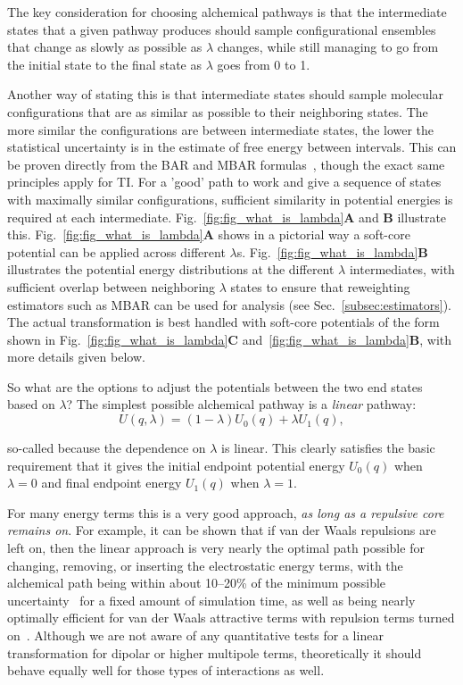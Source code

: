 \documentclass[9pt,bestpractices]{livecoms}
\begin{document}
The key consideration for choosing alchemical pathways is that the intermediate states that a given pathway produces should sample configurational ensembles that change as slowly as possible as $\lambda$ changes, while still managing to go from the initial state to the final state as $\lambda$ goes from 0 to 1.

Another way of stating this is that intermediate states should sample molecular configurations that are as similar as possible to their neighboring states. The more similar the configurations are between intermediate states, the lower the statistical uncertainty is in the estimate of free energy between intervals. This can be proven directly from the BAR and MBAR formulas~\cite{bennett1976efficient,klimovich2015guidelines}, though the exact same principles apply for TI. For a 'good' path to work and give a sequence of states with maximally similar configurations, sufficient similarity in potential energies is required at each intermediate. Fig.~\ref{fig:fig_what_is_lambda}\textbf{A} and \textbf{B} illustrate this. Fig.~\ref{fig:fig_what_is_lambda}\textbf{A} shows in a pictorial way a soft-core potential can be applied across different $\lambda$s. Fig.~\ref{fig:fig_what_is_lambda}\textbf{B} illustrates the potential energy distributions at the different $\lambda$ intermediates, with sufficient overlap between neighboring $\lambda$ states to ensure that reweighting estimators such as MBAR can be used for analysis (see Sec.~\ref{subsec:estimators}). The actual transformation is best handled with soft-core potentials of the form shown in Fig.~\ref{fig:fig_what_is_lambda}\textbf{C} and~\ref{fig:fig_what_is_lambda}\textbf{B}, with more details given below. 

So what are the options to adjust the potentials between the two end states based on $\lambda$? The simplest possible alchemical pathway is a \textit{linear} pathway:
\begin{equation}
U(q,\lambda) = (1-\lambda) U_0(q) + \lambda U_1(q), \end{equation}

so-called because the dependence on $\lambda$ is linear. This clearly satisfies the basic requirement that it gives the initial endpoint potential energy $U_0(q)$ when $\lambda=0$ and final endpoint energy $U_1(q)$ when $\lambda=1$. 

For many energy terms this is a very good approach, \textit{as long as a repulsive core remains on}. For example, it can be shown that if van der Waals repulsions are left on, then the linear approach is very nearly the optimal path possible for changing, removing, or inserting the electrostatic energy terms, with the alchemical path being within about 10--20\% of the minimum possible uncertainty~\cite{naden2015linear} for a fixed amount of simulation time, as well as being nearly optimally efficient for van der Waals attractive terms with repulsion terms turned on~\cite{naden2014linear}. Although we are not aware of any quantitative tests for a linear transformation for dipolar or higher multipole terms, theoretically it should behave equally well for those types of interactions as well.
\end{document}
